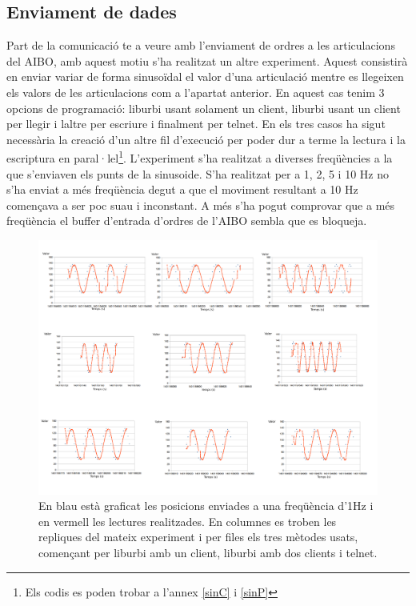 \documentclass[12pt,a4paper,final,twoside]{article}
\begin{document}
\subsection{Enviament de dades}
Part de la comunicació te a veure amb l'enviament de ordres a les articulacions del AIBO, amb aquest motiu s'ha realitzat un altre experiment. 
Aquest consistirà en enviar variar de forma sinusoïdal el valor d'una articulació mentre es llegeixen els valors de les articulacions com a l'apartat anterior. 
En aquest cas tenim 3 opcions de programació: liburbi usant solament un client, liburbi usant un client per llegir i laltre per escriure i finalment per telnet.
En els tres casos ha sigut necessària la creació d'un altre fil d'execució per poder dur a terme la lectura i la escriptura en paral·lel\footnote{Els codis es poden trobar a l'annex \ref{sinC} i \ref{sinP}}.
L'experiment s'ha realitzat a diverses freqüències a la que s'enviaven els punts de la sinusoide. S'ha realitzat per a 1, 2, 5 i 10 Hz no s'ha enviat a més freqüència degut a que el moviment resultant a 10 Hz començava a ser poc suau i inconstant. A més s'ha pogut comprovar que a més freqüència el buffer d'entrada d'ordres de l'AIBO sembla que es bloqueja.  
\begin{figure}[H]
	\centering
    \includegraphics[scale=0.33]{images/sin1H.pdf}
	 \caption{En blau està graficat les posicions enviades a una freqüència d'1Hz i en vermell les lectures realitzades. En columnes es troben les repliques del mateix experiment i per files els tres mètodes usats, començant per liburbi amb un client, liburbi amb dos clients i telnet.}
  \label{fig:sin1H}
\end{figure}
\end{document}
